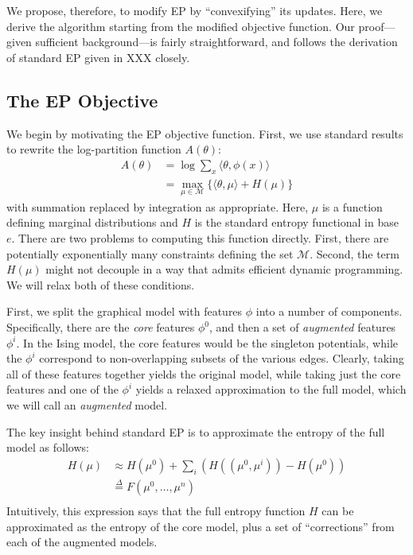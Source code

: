 \documentclass[times, 10pt,twocolumn]{article}
\begin{document}
We propose, therefore, to modify EP by ``convexifying'' its updates.
Here, we derive the algorithm starting from the modified objective
function. Our proof---given sufficient background---is fairly
straightforward, and follows the derivation of standard EP given in
XXX closely.

\subsection{The EP Objective}

We begin by motivating the EP objective function. First, we use standard results to rewrite the log-partition
function $A(\theta)$:
\begin{equation}
  \begin{split}
     A(\theta) &= \log \sum_x \langle\theta,\phi(x)\rangle\\
     &= \max_{\mu \in \mathcal{M}} \{ \langle\theta,\mu\rangle + H(\mu) \}
   \end{split}
 \end{equation}
with summation replaced by integration as appropriate. Here, $\mu$
is a function defining marginal distributions and $H$ is the standard
entropy functional in base $e$. There are two problems to computing
this function directly. First, there are potentially exponentially
many constraints defining the set $\mathcal M$. Second, the term
$H(\mu)$ might not decouple in a way that admits efficient dynamic
programming. We will relax both of these conditions.

First, we split the graphical model with features $\phi$ into
a number of components. Specifically, there are the \textit{core}
features $\phi^0$, and then a set of \textit{augmented}
features $\phi^i$. In the Ising model, the core features would
be the singleton potentials, while the $\phi^i$ correspond to
non-overlapping subsets of the various edges. Clearly, taking all
of these features together yields the original model, while taking
just the core features and one of the $\phi^i$ yields 
a relaxed approximation to the full model, which we will call an
\textit{augmented} model.

The key insight behind standard EP is to approximate the entropy of
the full model as follows:
\begin{equation}
  \begin{split}
     H(\mu) &\approx H(\mu^0) + \sum_i \left ( H( (\mu^0,\mu^i)) -
     H(\mu^0)\right) \\
     & \stackrel{\Delta}= F(\mu^0, \ldots, \mu^n) \\
     \label{eqn:epentropy}
   \end{split}
 \end{equation}
Intuitively, this expression says that the full entropy function
$H$ can be approximated as the entropy of the core model, plus
a set of ``corrections'' from each of the augmented models.
\end{document}
